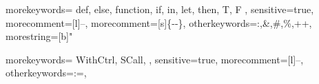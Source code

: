 { morekeywords={
  	def,
    else,
    function,
    if,
    in,
    let,
    then,
    T,
    F
  },
  sensitive=true, %
  morecomment=[l]{--}, %
  morecomment=[s]{\{-}{-\}}, %
  otherkeywords={:,\&,\#,\%,++},
  morestring=[b]" %
}



{  morekeywords={
		WithCtrl,
		SCall,
	},
	sensitive=true, 
	morecomment=[l]{--}, 
	otherkeywords={:=},
}

